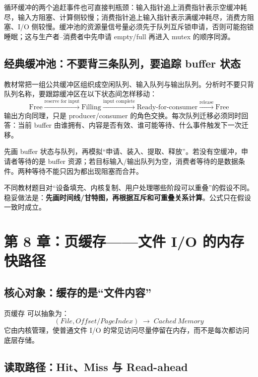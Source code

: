 \documentclass[UTF8,fontset=fandol,11pt,a4paper]{ctexart}
\newcommand{\kw}[1]{\textbf{#1}}
\newcommand{\arr}{\;\longrightarrow\;}
\begin{document}
循环缓冲的两个追赶事件也可直接判瓶颈：输入指针追上消费指针表示空缓冲耗尽，输入方阻塞、计算侧较慢；消费指针追上输入指针表示满缓冲耗尽，消费方阻塞、I/O 侧较慢。缓冲池的资源量信号量必须先于队列互斥锁申请，否则可能抱锁睡眠；这与生产者--消费者中先申请 empty/full 再进入 mutex 的顺序同源。

\subsection{经典缓冲池：不要背三条队列，要追踪 buffer 状态}

教材常把一组公共缓冲区组织成空闲队列、输入队列与输出队列。分析时不要只背队列名称，要跟踪缓冲区在以下状态间怎样移动：
\[
\boxed{
\text{Free}
\xrightarrow{\text{reserve for input}}
\text{Filling}
\xrightarrow{\text{input complete}}
\text{Ready-for-consumer}
\xrightarrow{\text{release}}
\text{Free}
}
\]
输出方向同理，只是 producer/consumer 的角色交换。每次队列迁移必须同时回答：当前 buffer 由谁拥有、内容是否有效、谁可能等待、什么事件触发下一次迁移。

\begin{exam}[缓冲池题的固定检查]
先画 buffer 状态与队列，再模拟“申请、装入、提取、释放”。若没有空缓冲，申请者等待的是 buffer 资源；若目标输入/输出队列为空，消费者等待的是数据条件。两种等待不能只因为都出现阻塞而合并。
\end{exam}

\begin{exam}[缓冲题不要死背总时间公式]
不同教材题目对“设备填充、内核复制、用户处理哪些阶段可以重叠”的假设不同。稳妥做法是：\kw{先画时间线/甘特图，再根据互斥和可重叠关系计算}。公式只在假设一致时成立。
\end{exam}

\section{第 8 章：页缓存——文件 I/O 的内存 快路径}

\subsection{核心对象：缓存的是“文件内容”}
页缓存 可以抽象为：
\[
\boxed{(File,Offset/PageIndex)\arr Cached\ Memory}
\]
它由内核管理，使普通文件 I/O 的常见访问尽量停留在内存，而不是每次都访问底层存储。

\subsection{读取路径：Hit、Miss 与 Read-ahead}
\end{document}
